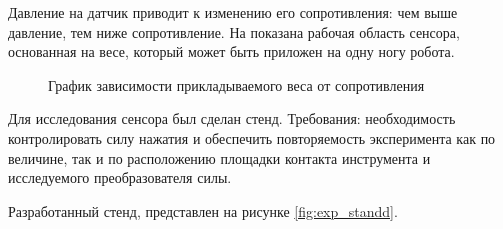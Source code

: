 Давление на датчик приводит к изменению его сопротивления: чем выше давление, тем ниже сопротивление. На  показана рабочая область сенсора, основанная на весе, который может быть приложен на одну ногу робота.
\begin{figure}[h]
    \centering
    \caption{График зависимости прикладываемого веса от сопротивления}
    \label{fig:velostat_pressure_resistance.jpg}
\end{figure}

Для исследования сенсора был сделан стенд. Требования: необходимость контролировать силу нажатия и обеспечить повторяемость эксперимента как по величине, так и по расположению площадки контакта инструмента и исследуемого преобразователя силы. 

Разработанный стенд, представлен на рисунке \ref{fig:exp_standd}.

